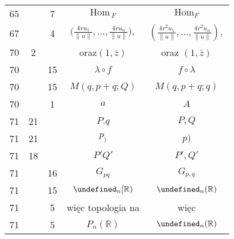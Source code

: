 \documentclass[a4paper,11pt]{article}
\newcommand{\fr}{\frac}
\newcommand{\mb}{\mathbb}
\newcommand{\mc}{\mathcal}
\newcommand{\mr}{\mathrm}
\newcommand{\ld}{\ldots}
\newcommand{\Hom}{\mr{Hom}}
\newcommand{\la}{\lambda}
\newcommand{\R}{\mb{R}}
\let\P\undefined
\newcommand{\P}{\mc{P}}
\providecommand{\norm}[1]{\lVert #1 \rVert}
\begin{document}
\begin{center}
\begin{tabular}{|c|c|c|c|c|}
    65 & &  7 & $\Hom_{ \: F }$ & $\Hom_{ F }$ \\
    67 & &  4 & $\big( \fr{ 4 r u_{ 1 } }{ \norm{ u } }, \ld,
                \fr{ 4 r u_{ n } }{ \norm{ u } } \big),$
           & $\left( \fr{ 4 r^{ 2 } u_{ 1 } }{ \norm{ u } }, \ld,
             \fr{ 4 r^{ 2 } u_{ n } }{ \norm{ u } } \right)\! ,$ \\
    70 &  2 & & oraz$( 1, \bar{ z } )$ & oraz $( 1, \bar{ z } )$ \\
    70 & & 15 & $\la \circ f$ & $f \circ \la$ \\
    70 & & 15 & $M( q, p + q; Q)$ & $M( q, p + q; q)$ \\
    70 & &  1 & $a$ & $A$ \\
    71 & 21 & & $P.q$ & $P, Q$ \\
    71 & 21 & & $p_{ ) }$ & $p )$ \\
    71 & 18 & & $P' Q'$ & $P', Q'$ \\
    71 & & 16 & $G_{ pq }$ & $G_{ p, q }$ \\
    71 & & 15 & $\P_{ n }[ \R )$ & $\P_{ n }( \R )$ \\
    71 & &  5 & więc topologia na & więc \\
    71 & &  5 & $P_{ n }( \R )$ & $\P_{ n }( \R )$ \\ \hline
  \end{tabular}


\end{center}
\end{document}
